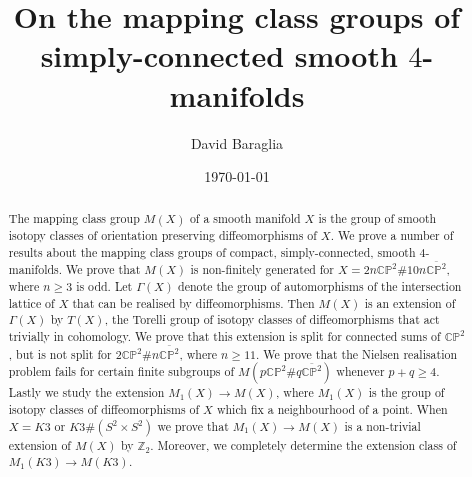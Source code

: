 \documentclass{amsart}
\theoremstyle{definition}
\theoremstyle{remark}
\numberwithin{equation}{section}
\begin{document}
\setlength\parskip{0.5em plus 0.1em minus 0.2em}

\title{On the mapping class groups of simply-connected smooth $4$-manifolds}
\author{David Baraglia}


\address{School of Mathematical Sciences, The University of Adelaide, Adelaide SA 5005, Australia}





\date{\today}


\begin{abstract}

The mapping class group $M(X)$ of a smooth manifold $X$ is the group of smooth isotopy classes of orientation preserving diffeomorphisms of $X$. We prove a number of results about the mapping class groups of compact, simply-connected, smooth $4$-manifolds. We prove that $M(X)$ is non-finitely generated for $X = 2n \mathbb{CP}^2 \# 10n \overline{\mathbb{CP}^2}$, where $n \ge 3$ is odd. Let $\Gamma(X)$ denote the group of automorphisms of the intersection lattice of $X$ that can be realised by diffeomorphisms. Then $M(X)$ is an extension of $\Gamma(X)$ by $T(X)$, the Torelli group of isotopy classes of diffeomorphisms that act trivially in cohomology. We prove that this extension is split for connected sums of $\mathbb{CP}^2$, but is not split for $2\mathbb{CP}^2 \# n \overline{\mathbb{CP}^2}$, where $n \ge 11$. We prove that the Nielsen realisation problem fails for certain finite subgroups of $M( p \mathbb{CP}^2 \# q \overline{\mathbb{CP}^2} )$ whenever $p+q \ge 4$. Lastly we study the extension $M_1(X) \to M(X)$, where $M_1(X)$ is the group of isotopy classes of diffeomorphisms of $X$ which fix a neighbourhood of a point. When $X = K3$ or $K3 \# (S^2 \times S^2)$ we prove that $M_1(X) \to M(X)$ is a non-trivial extension of $M(X)$ by $\mathbb{Z}_2$. Moreover, we completely determine the extension class of $M_1(K3) \to M(K3)$.

\end{abstract}



\end{document}

